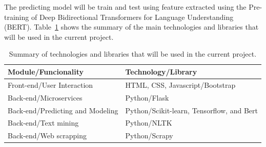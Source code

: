 \documentclass[a4paper]{article}
\begin{document}
The predicting model will be train and test using feature extracted using the Pre-training of Deep Bidirectional Transformers for
Language Understanding (BERT)\cite{devlin:2019}. Table~\ref{tab:techology_summary} shows the summary of the main technologies and libraries that will be used in the current project.

\begin{table}[h!]
    \centering
    \begin{tabular}{@{}ll@{}}
    \toprule
    {\bf Module/Funcionality} & {\bf Technology/Library}                         \\ \midrule
    Front-end/User Interaction           & HTML, CSS, Javascript/Bootstrap           \\
    Back-end/Microservices            & Python/Flask                              \\
    Back-end/Predicting and Modeling & Python/Scikit-learn, Tensorflow, and Bert \\
    Back-end/Text mining         & Python/NLTK                               \\
    Back-end/Web scrapping       & Python/Scrapy                             \\ \bottomrule
    \end{tabular}
    \caption{Summary of technologies and libraries that will be used in the current project.}
    \label{tab:techology_summary}
\end{table}

\printbibliography

\end{document}

